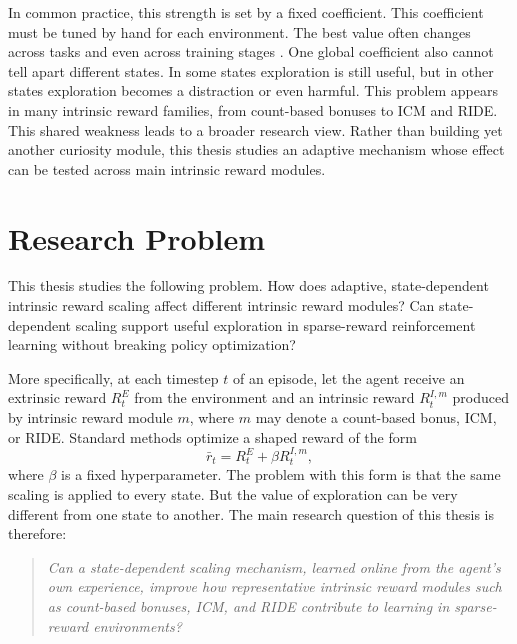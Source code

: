 In common practice, this strength is set by a fixed coefficient. This coefficient must be tuned by hand for each environment. The best value often changes across tasks and even across training stages \cite{chen2022eipo,yuan2023airs}. One global coefficient also cannot tell apart different states. In some states exploration is still useful, but in other states exploration becomes a distraction or even harmful. This problem appears in many intrinsic reward families, from count-based bonuses to ICM and RIDE. This shared weakness leads to a broader research view. Rather than building yet another curiosity module, this thesis studies an adaptive mechanism whose effect can be tested across main intrinsic reward modules.

\section{Research Problem}
This thesis studies the following problem. How does adaptive, state-dependent intrinsic reward scaling affect different intrinsic reward modules? Can state-dependent scaling support useful exploration in sparse-reward reinforcement learning without breaking policy optimization?

More specifically, at each timestep $t$ of an episode, let the agent receive an extrinsic reward $R_t^E$ from the environment and an intrinsic reward $R_t^{I,m}$ produced by intrinsic reward module $m$, where $m$ may denote a count-based bonus, ICM, or RIDE. Standard methods optimize a shaped reward of the form
\begin{equation}
\bar{r}_t = R_t^E + \beta R_t^{I,m},
\end{equation}
where $\beta$ is a fixed hyperparameter. The problem with this form is that the same scaling is applied to every state. But the value of exploration can be very different from one state to another. The main research question of this thesis is therefore:
\begin{quote}
\textit{Can a state-dependent scaling mechanism, learned online from the agent's own experience, improve how representative intrinsic reward modules such as count-based bonuses, ICM, and RIDE contribute to learning in sparse-reward environments?}
\end{quote}

